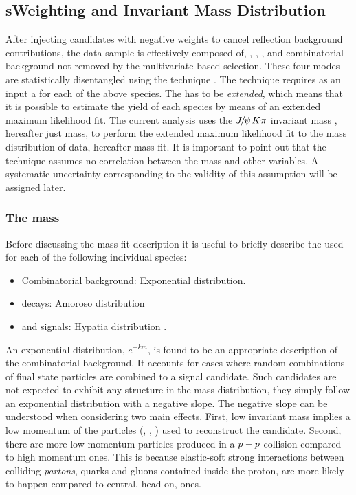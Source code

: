 \subsection{sWeighting and Invariant Mass Distribution}
\label{sWeighting_and_mass}

After injecting candidates with negative weights to cancel reflection background contributions,
the data sample is effectively composed of, \BdJpsiKpi, \BsJpsiKpi, \LbJpsippi, and combinatorial background not removed by the
multivariate based selection. These four modes are statistically disentangled using the \sPlot technique \cite{splot}.
The technique requires as an input a \pdf for each of the above species. The \pdf has to be {\it extended},
which means that it is possible to estimate the yield of each species by means of an extended maximum likelihood fit.
The current analysis uses the ${J\mskip -3mu/\mskip -2mu\psi\mskip 2mu} K\pi$ invariant mass \pdf, hereafter just mass, to perform the extended maximum
likelihood fit to the mass distribution of data, hereafter mass fit. It is important to point out that the \sPlot
technique assumes no correlation between the mass and other variables.
A systematic uncertainty corresponding to the validity of this assumption will be assigned later.

\subsubsection{The mass \pdf}
Before discussing the mass fit description it is useful to briefly describe the \pdfs used for each of the following individual species:

\begin{itemize}
\item Combinatorial background: Exponential distribution.
\item \LbJpsippi decays: Amoroso distribution \cite{Amoroso}
\item \Bd and \Bs signals: Hypatia distribution \cite{Santos:2013gra}.
\end{itemize}

\noindent An exponential distribution, $e^{-km}$, is found to be an appropriate description of the combinatorial background. It accounts
for cases where random combinations of final state particles are combined to a signal candidate. Such candidates are not expected to
exhibit any structure in the mass distribution, they simply follow an exponential distribution with a negative slope.
The negative slope can be understood when considering two main effects. First, low invariant mass implies a low momentum of
the particles (\kaon, \pion, \mmu) used to reconstruct the \BsJpsiKst candidate. Second, there are more low momentum
particles produced in a $p-p$ collision compared to high momentum ones. This is because elastic-soft strong
interactions between colliding {\it partons}, quarks and gluons contained inside the proton, are more likely to happen
compared to central, head-on, ones.


